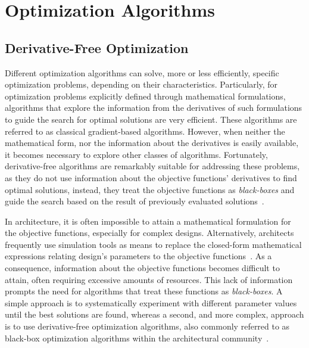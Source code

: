 	
	
	
	
	
\section{Optimization Algorithms}
	
	\subsection{Derivative-Free Optimization}
	\label{sec:dfo}
	
	Different optimization algorithms can solve, more or less efficiently, specific optimization problems, depending on their characteristics. Particularly, for optimization problems explicitly defined through mathematical formulations, algorithms that explore the information from the derivatives of such formulations to guide the search for optimal solutions are very efficient. These algorithms are referred to as classical gradient-based algorithms. However, when neither the mathematical form, nor the information about the derivatives is easily available, it becomes necessary to explore other classes of algorithms. Fortunately, derivative-free algorithms are remarkably suitable for addressing these problems, as they do not use information about the objective functions' derivatives to find optimal solutions, instead, they treat the objective functions as \textit{black-boxes} and guide the search based on the result of previously evaluated solutions~\cite{Rios2013}.
	
	In architecture, it is often impossible to attain a mathematical formulation for the objective functions, especially for complex designs. Alternatively, architects frequently use simulation tools as means to replace the closed-form mathematical expressions relating design's parameters to the objective functions~\cite{Wortmann2016BBO}. As a consequence, information about the objective functions becomes difficult to attain, often requiring excessive amounts of resources. This lack of information prompts the need for algorithms that treat these functions as \textit{black-boxes}. A simple approach is to systematically experiment with different parameter values until the best solutions are found, whereas a second, and more complex, approach is to use derivative-free optimization algorithms, also commonly referred to as black-box optimization algorithms within the architectural community~\cite{Wortmann2016BBO}. %
	
